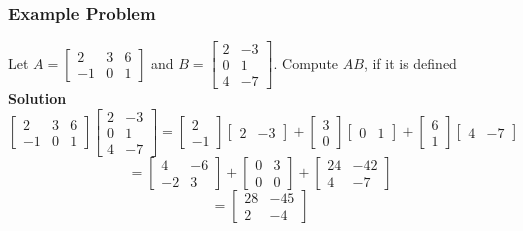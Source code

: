 \subsubsection{Example Problem}
Let $A = \begin{bmatrix}
  2 & 3 & 6 \\
  -1 & 0 & 1
\end{bmatrix}$ and $B = \begin{bmatrix}
  2 & -3 \\
  0 & 1 \\
  4 & -7
\end{bmatrix}.$ Compute $AB$, if it is defined
\\[8pt]
\textbf{Solution}
\[
  \begin{bmatrix}
    2 & 3 & 6 \\
    -1 & 0 & 1
  \end{bmatrix} \begin{bmatrix}
    2 & -3 \\
    0 & 1 \\
    4 & -7
  \end{bmatrix} = \begin{bmatrix}
    2 \\ -1
  \end{bmatrix} \begin{bmatrix}
    2 & -3
  \end{bmatrix} + \begin{bmatrix}
    3 \\ 0
  \end{bmatrix} \begin{bmatrix}
    0 & 1
  \end{bmatrix} + \begin{bmatrix}
    6 \\ 1
  \end{bmatrix} \begin{bmatrix}
    4 & -7
  \end{bmatrix}
\]
\[
  = \begin{bmatrix}
    4 & -6 \\
    -2 & 3
  \end{bmatrix} + \begin{bmatrix}
    0 & 3 \\
    0 & 0
  \end{bmatrix} + \begin{bmatrix}
    24 & -42 \\
    4 & -7
  \end{bmatrix}
\]
\[
  = \begin{bmatrix}
    28 & -45 \\
    2 & -4
  \end{bmatrix}
\]
